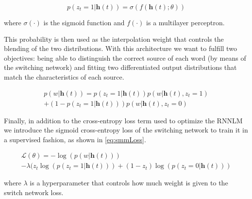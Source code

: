 \begin{equation} \label{eq:probSwitch}
	p(z_t=1|\mathbf{h}(t)) = \sigma(f(\mathbf{h}(t);\theta))
\end{equation}

where $\sigma(\cdot)$ is the sigmoid function and $f(\cdot)$ is a multilayer perceptron.

This probability is then used as the interpolation weight that controls the blending of the two distributions. With this architecture we want to fulfill two objectives: being able to distinguish the correct source of each word (by means of the switching network) and fitting two differentiated output distributions that match the characteristics of each source. 

\begin{equation} \label{eq:smm}
	\begin{gathered}
		p(w|\mathbf{h}(t)) = p(z_t=1|\mathbf{h}(t))p(w|\mathbf{h}(t), z_t=1) \\
		+ (1-p(z_t=1|\mathbf{h}(t)))p(w|\mathbf{h}(t), z_t=0)
	\end{gathered}
\end{equation}

Finally, in addition to the cross-entropy loss term used to optimize the RNNLM we introduce the sigmoid cross-entropy loss of the switching network to train it in a supervised fashion, as shown in \autoref{eq:smmLoss}.

\begin{equation} \label{eq:smmLoss}
	\begin{gathered}
		\mathcal{L}(\theta) = -\log(p(w|\mathbf{h}(t))) \\
		- \lambda(z_t\log(p(z_t=1|\mathbf{h}(t))) + (1 - z_t)\log(p(z_t=0|\mathbf{h}(t)))
	\end{gathered}
\end{equation}

where $\lambda$ is a hyperparameter that controls how much weight is given to the switch network loss.
